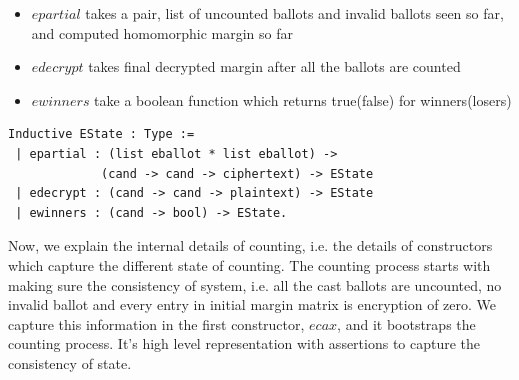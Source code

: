 \documentclass{llncs}
\begin{document}
\begin{itemize}
 \item $epartial$ takes a pair, list of uncounted ballots and invalid ballots seen 
       so far, and computed homomorphic margin so far
 \item $edecrypt$ takes final decrypted margin after all the ballots are counted
 \item $ewinners$ take a boolean function which returns true(false) for winners(losers)
\end{itemize}


\begin{verbatim}
Inductive EState : Type :=
 | epartial : (list eballot * list eballot) ->
             (cand -> cand -> ciphertext) -> EState
 | edecrypt : (cand -> cand -> plaintext) -> EState
 | ewinners : (cand -> bool) -> EState.
\end{verbatim}



Now, we explain the internal details of counting, i.e. the details
of constructors which capture the different state of counting.
The counting process starts with  making sure the 
consistency of  system, i.e. all the cast ballots are uncounted, no invalid
ballot and every entry in initial margin matrix is encryption of zero. 
We capture this information in  
the first constructor, $ecax$, and it bootstraps the counting process. 
It's high level representation with assertions to capture the consistency 
of state.

\end{document}
